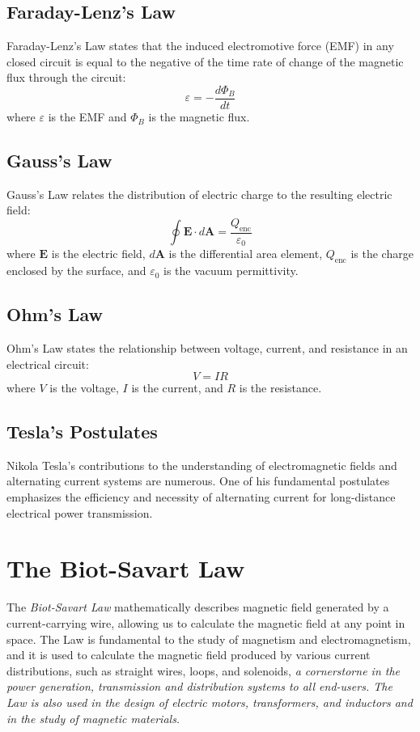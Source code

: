 \documentclass[10pt]{article}
\begin{document}
{	\subsection{Faraday-Lenz's Law}
	Faraday-Lenz's Law states that the induced electromotive force (EMF) in any
	closed circuit is equal to the negative of the time rate of change of the
	magnetic flux through the circuit:
	\[
		\varepsilon = -\frac{d\Phi_{B}}{dt}
	\]
	where $\varepsilon$ is the EMF and $\Phi_{B}$ is the magnetic flux.

	\subsection{Gauss's Law}
	Gauss's Law relates the distribution of electric charge to the resulting electric
	field:
	\[
		\oint \mathbf{E}\cdot d\mathbf{A}= \frac{Q_{\text{enc}}}{\varepsilon_{0}}
	\]
	where $\mathbf{E}$ is the electric field, $d\mathbf{A}$ is the differential area
	element, $Q_{\text{enc}}$ is the charge enclosed by the surface, and $\varepsilon
	_{0}$ is the vacuum permittivity.

	\subsection{Ohm's Law}
	Ohm's Law states the relationship between voltage, current, and resistance in an
	electrical circuit:
	\[
		V = IR
	\]
	where $V$ is the voltage, $I$ is the current, and $R$ is the resistance.

	\subsection{Tesla's Postulates}
	Nikola Tesla's contributions to the understanding of electromagnetic fields
	and alternating current systems are numerous. One of his fundamental postulates
	emphasizes the efficiency and necessity of alternating current for long-distance
	electrical power transmission.

	\newpage

	\section{The Biot-Savart Law}

	The \emph{Biot-Savart Law} mathematically describes magnetic field generated
	by a current-carrying wire, allowing us to calculate the magnetic field at any
	point in space. The Law is fundamental to the study of magnetism and
	electromagnetism, and it is used to calculate the magnetic field produced by various
	current distributions, such as straight wires, loops, and solenoids, \emph{a
	cornerstorne in the power generation, transmission and distribution systems to
	all end-users. The Law is also used in the design of electric motors, transformers,
	and inductors and in the study of magnetic materials.}

}
\end{document}
